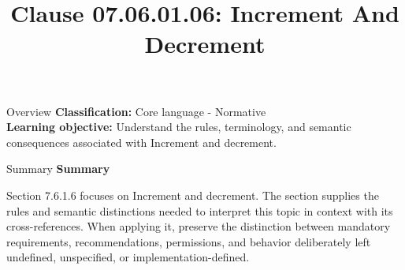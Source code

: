 \documentclass[10pt,letterpaper]{article}
\title{Clause 07.06.01.06: Increment And Decrement}
\author{}
\date{}
\begin{document}
\maketitle
\begin{CornellOverviewBox}{Overview}
\textbf{Classification:} Core language - Normative\\[2pt]
\textbf{Learning objective:} Understand the rules, terminology, and semantic consequences associated with Increment and decrement.
\end{CornellOverviewBox}\begin{CornellSummaryBox}{Summary}
{\sffamily\bfseries\color{Accent} Summary}\par\vspace{3pt}Section 7.6.1.6 focuses on Increment and decrement. The section supplies the rules and semantic distinctions needed to interpret this topic in context with its cross-references. When applying it, preserve the distinction between mandatory requirements, recommendations, permissions, and behavior deliberately left undefined, unspecified, or implementation-defined.
\end{CornellSummaryBox}
\end{document}
